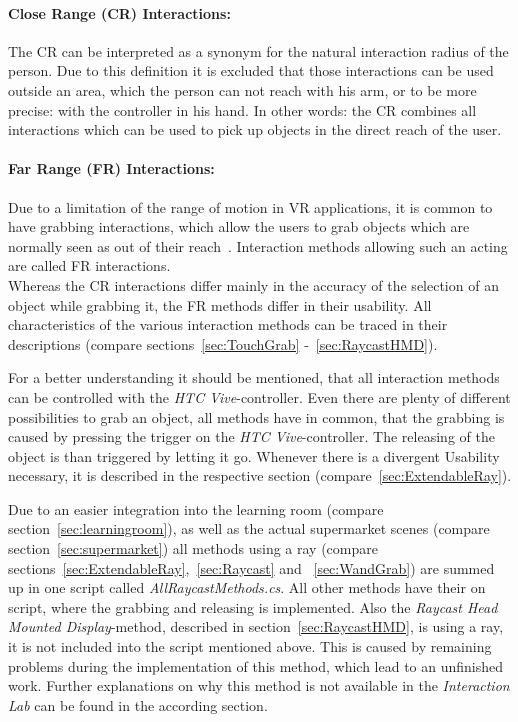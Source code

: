 \paragraph{Close Range (CR) Interactions:} The CR can be interpreted as a synonym for the natural interaction radius of the person. Due to this definition it is excluded that those interactions can be used outside an area, which the person can not reach with his arm, or to be more precise: with the controller in his hand. In other words: the CR combines all interactions which can be used to pick up objects in the direct reach of the user.

\paragraph{Far Range (FR) Interactions:} Due to a limitation of the range of motion in VR applications, it is common to have grabbing interactions, which allow the users to grab objects which are normally seen as out of their reach~\cite{VRBook}. Interaction methods allowing such an acting are called FR interactions. \\

Whereas the CR interactions differ mainly in the accuracy of the selection of an object while grabbing it, the FR methods differ in their usability. All characteristics of the various interaction methods can be traced in their descriptions (compare sections~\ref{sec:TouchGrab} -~\ref{sec:RaycastHMD}).

For a better understanding it should be mentioned, that all interaction methods can be controlled with the \textit{HTC Vive}-controller. Even there are plenty of different possibilities to grab an object, all methods have in common, that the grabbing is caused by pressing the trigger on the \textit{HTC Vive}-controller. The releasing of the object is than triggered by letting it go. Whenever there is a divergent Usability necessary, it is described in the respective section (compare~\ref{sec:ExtendableRay}).

Due to an easier integration into the learning room (compare section~\ref{sec:learningroom}), as well as the actual supermarket scenes (compare section~\ref{sec:supermarket}) all methods using a ray (compare sections~\ref{sec:ExtendableRay},~\ref{sec:Raycast} and ~\ref{sec:WandGrab}) are summed up in one script called \textit{AllRaycastMethods.cs}. All other methods have their on script, where the grabbing and releasing is implemented. Also the \textit{Raycast Head Mounted Display}-method, described in section~\ref{sec:RaycastHMD}, is using a ray, it is not included into the script mentioned above. This is caused by remaining problems during the implementation of this method, which lead to an unfinished work. Further explanations on why this method is not available in the \textit{Interaction Lab} can be found in the according section.

